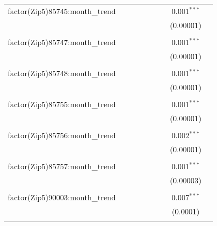 \begin{table}[H]
{\begin{tabular}{@{\extracolsep{5pt}}lcccccccc}
  factor(Zip5)85745:month\_trend &  &  &  &  &  &  & 0.001$^{***}$ &  \\  

   &  &  &  &  &  &  & (0.00001) &  \\  

   & & & & & & & & \\  

  factor(Zip5)85747:month\_trend &  &  &  &  &  &  & 0.001$^{***}$ &  \\  

   &  &  &  &  &  &  & (0.00001) &  \\  

   & & & & & & & & \\  

  factor(Zip5)85748:month\_trend &  &  &  &  &  &  & 0.001$^{***}$ &  \\  

   &  &  &  &  &  &  & (0.00001) &  \\  

   & & & & & & & & \\  

  factor(Zip5)85755:month\_trend &  &  &  &  &  &  & 0.001$^{***}$ &  \\  

   &  &  &  &  &  &  & (0.00001) &  \\  

   & & & & & & & & \\  

  factor(Zip5)85756:month\_trend &  &  &  &  &  &  & 0.002$^{***}$ &  \\  

   &  &  &  &  &  &  & (0.00001) &  \\  

   & & & & & & & & \\  

  factor(Zip5)85757:month\_trend &  &  &  &  &  &  & 0.001$^{***}$ &  \\  

   &  &  &  &  &  &  & (0.00003) &  \\  

   & & & & & & & & \\  

  factor(Zip5)90003:month\_trend &  &  &  &  &  &  & 0.007$^{***}$ &  \\  

   &  &  &  &  &  &  & (0.0001) &  \\  

   & & & & & & & & \\  


\end{tabular}}
\end{table}
